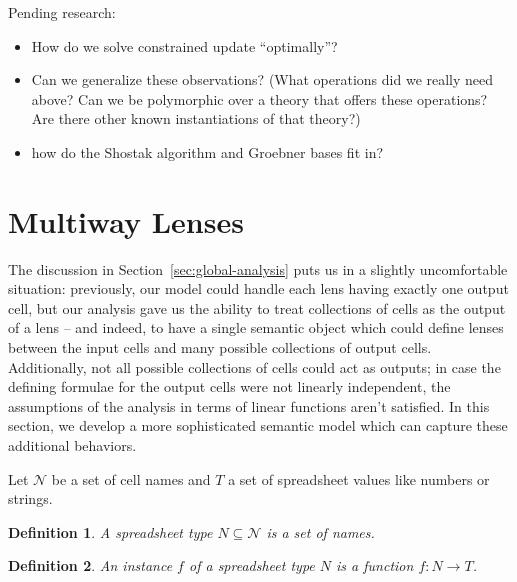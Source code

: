 \documentclass{article}
\newtheorem{definition}{Definition}
\begin{document}
Pending research:
\begin{itemize}
    \item How do we solve constrained update ``optimally''?
    \item Can we generalize these observations? (What operations did we
        really need above? Can we be polymorphic over a theory that offers
        these operations? Are there other known instantiations of that
        theory?)
    \item how do the Shostak algorithm and Groebner bases fit in?
\end{itemize}

\section{Multiway Lenses}
\label{sec:multiway}
The discussion in Section~\ref{sec:global-analysis} puts us in a slightly
uncomfortable situation: previously, our model could handle each lens having
exactly one output cell, but our analysis gave us the ability to treat
collections of cells as the output of a lens -- and indeed, to have a single
semantic object which could define lenses between the input cells and many
possible collections of output cells. Additionally, not all possible
collections of cells could act as outputs; in case the defining formulae for
the output cells were not linearly independent, the assumptions of the
analysis in terms of linear functions aren't satisfied. In this section, we
develop a more sophisticated semantic model which can capture these
additional behaviors. %


\newcommand{\Names}{\mathcal N}
\newcommand{\sto}{\mapsto}
\newcommand{\mlens}[1]{\mathcal M(#1)}
\newcommand{\mput}{\mathit{put}}
\newcommand{\danger}{\mathcal D}

Let $\Names$ be a set of cell names and 
$T$ a set of spreadsheet values like numbers or strings.

\begin{definition}
    A \emph{spreadsheet type} $N \subseteq \Names$ is a set of names.
\end{definition}

\begin{definition}
    An \emph{instance} $f$ of a spreadsheet type $N$ is a function $f : N \to T$.
\end{definition}
\end{document}
